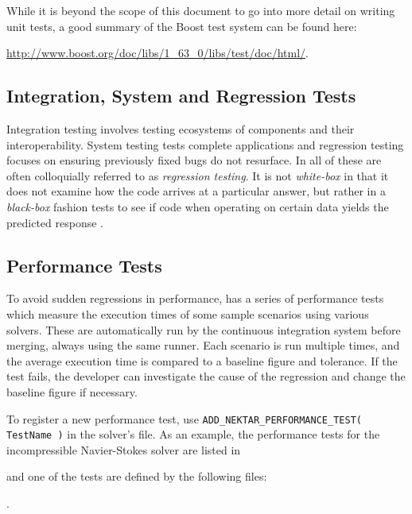 While it is beyond the scope of this document to go into more detail
on writing unit tests, a good summary of the Boost test system can be
found here:

\url{http://www.boost.org/doc/libs/1\_63\_0/libs/test/doc/html/}.


\subsection{Integration, System and Regression Tests}
Integration testing involves testing ecosystems of components and their interoperability. System testing tests complete applications and regression testing focuses on ensuring previously fixed bugs do not resurface. In {\nek} all of these are often colloquially referred to as {\em regression testing}. It is not \emph{white-box} in that it does not examine how the
code arrives at a particular answer, but rather in a \emph{black-box}
fashion tests to see if code when operating on certain data yields the
predicted response \cite{KFN-testing}.

\subsection{Performance Tests}
To avoid sudden regressions in performance, {\nek} has a series of performance tests which measure the execution times of some sample scenarios using various solvers. These are automatically run by the continuous integration system before merging, always using the same runner. Each scenario is run multiple times, and the average execution time is compared to a baseline figure and tolerance. If the test fails, the developer can investigate the cause of the regression and change the baseline figure if necessary.

To register a new performance test, use \lstinline{ADD_NEKTAR_PERFORMANCE_TEST( TestName )} in the solver's  file. As an example, the performance tests for the incompressible Navier-Stokes solver are listed in


and one of the tests are defined by the following files:


.\\

